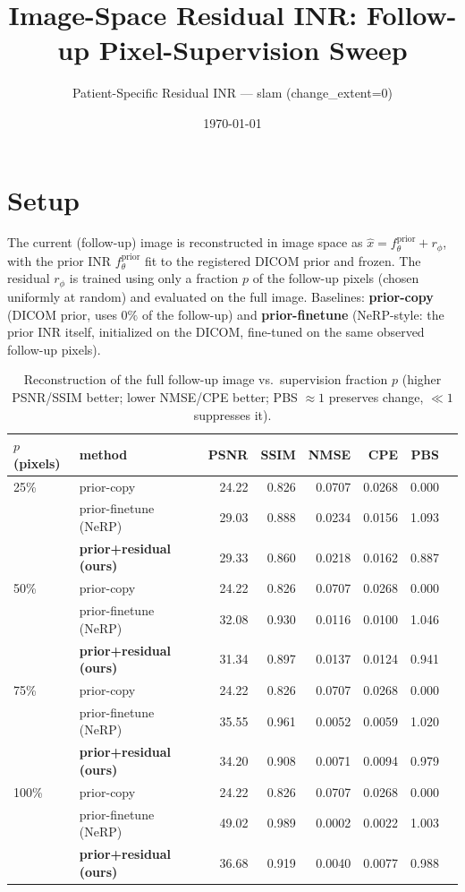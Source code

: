 \documentclass[11pt]{article}
\title{Image-Space Residual INR: Follow-up Pixel-Supervision Sweep}
\author{Patient-Specific Residual INR --- slam (change\_extent=0)}
\date{\today}
\begin{document}
\maketitle
\section*{Setup}
The current (follow-up) image is reconstructed in image space as $\hat{x} = f_\theta^{\mathrm{prior}} + r_\phi$, with the prior INR $f_\theta^{\mathrm{prior}}$ fit to the registered DICOM prior and frozen. The residual $r_\phi$ is trained using only a fraction $p$ of the follow-up pixels (chosen uniformly at random) and evaluated on the full image. Baselines: \textbf{prior-copy} (DICOM prior, uses $0\%$ of the follow-up) and \textbf{prior-finetune} (NeRP-style: the prior INR itself, initialized on the DICOM, fine-tuned on the same observed follow-up pixels).
\begin{table}[H]\centering
\caption{Reconstruction of the full follow-up image vs.\ supervision fraction $p$ (higher PSNR/SSIM better; lower NMSE/CPE better; PBS $\approx 1$ preserves change, $\ll 1$ suppresses it).}
\begin{tabular}{llrrrrrr}
\toprule
$p$ (pixels) & method & PSNR & SSIM & NMSE & CPE & PBS \\
\midrule
25\% & prior-copy & 24.22 & 0.826 & 0.0707 & 0.0268 & 0.000 \\
 & prior-finetune (NeRP) & 29.03 & 0.888 & 0.0234 & 0.0156 & 1.093 \\
 & \textbf{prior+residual (ours)} & 29.33 & 0.860 & 0.0218 & 0.0162 & 0.887 \\
\midrule
50\% & prior-copy & 24.22 & 0.826 & 0.0707 & 0.0268 & 0.000 \\
 & prior-finetune (NeRP) & 32.08 & 0.930 & 0.0116 & 0.0100 & 1.046 \\
 & \textbf{prior+residual (ours)} & 31.34 & 0.897 & 0.0137 & 0.0124 & 0.941 \\
\midrule
75\% & prior-copy & 24.22 & 0.826 & 0.0707 & 0.0268 & 0.000 \\
 & prior-finetune (NeRP) & 35.55 & 0.961 & 0.0052 & 0.0059 & 1.020 \\
 & \textbf{prior+residual (ours)} & 34.20 & 0.908 & 0.0071 & 0.0094 & 0.979 \\
\midrule
100\% & prior-copy & 24.22 & 0.826 & 0.0707 & 0.0268 & 0.000 \\
 & prior-finetune (NeRP) & 49.02 & 0.989 & 0.0002 & 0.0022 & 1.003 \\
 & \textbf{prior+residual (ours)} & 36.68 & 0.919 & 0.0040 & 0.0077 & 0.988 \\
\bottomrule
\end{tabular}\end{table}
\end{document}
